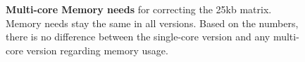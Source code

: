 
\begin{figure}[!htbp]
    \begin{centering}
        \caption[Multi-core Memory comparison]
        {\textbf{Multi-core Memory needs} for correcting the 25kb matrix. Memory
        needs stay the same in all versions. Based on the numbers, there is no
        difference between the single-core version and any multi-core version
        regarding memory usage.}
        \label{fig:memmulti}
    \end{centering}
\end{figure}

